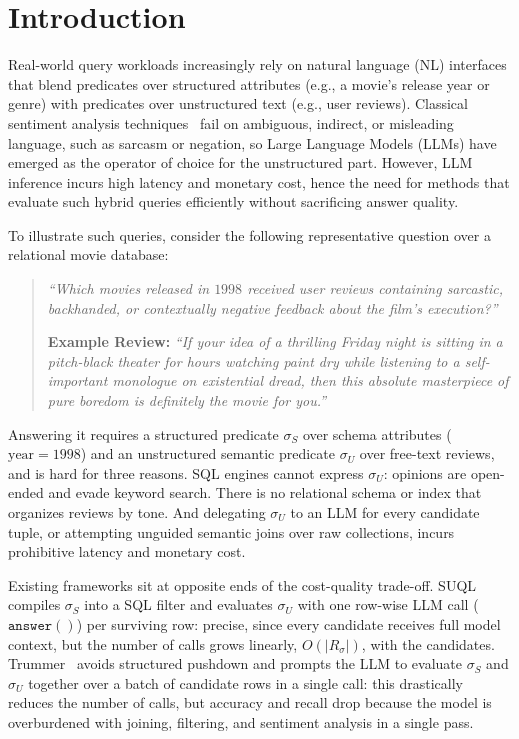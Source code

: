 \section{Introduction}
\label{sec:intro}
Real-world query workloads increasingly rely on natural language (NL) interfaces that blend predicates over structured attributes (e.g., a movie's release year or genre) with predicates over unstructured text (e.g., user reviews). Classical sentiment analysis techniques~\cite{Chandan2025ACS} fail on ambiguous, indirect, or misleading language, such as sarcasm or negation, so Large Language Models (LLMs) have emerged as the operator of choice for the unstructured part. However, LLM inference incurs high latency and monetary cost, hence the need for methods that evaluate such hybrid queries efficiently without sacrificing answer quality.

To illustrate such queries, consider the following representative question over a relational movie database:
\begin{quote}
\textit{``Which movies released in $1998$ received user reviews containing sarcastic, backhanded, or contextually negative feedback about the film's execution?''}

\smallskip
\noindent\textbf{Example Review:} \textit{``If your idea of a thrilling Friday night is sitting in a pitch-black theater for hours watching paint dry while listening to a self-important monologue on existential dread, then this absolute masterpiece of pure boredom is definitely the movie for you.''}
\end{quote}
Answering it requires a structured predicate $\sigma_S$ over schema attributes ($\text{year} = 1998$) and an unstructured semantic predicate $\sigma_U$ over free-text reviews, and is hard for three reasons. SQL engines cannot express $\sigma_U$: opinions are open-ended and evade keyword search. There is no relational schema or index that organizes reviews by tone. And delegating $\sigma_U$ to an LLM for every candidate tuple, or attempting unguided semantic joins over raw collections, incurs prohibitive latency and monetary cost.

Existing frameworks sit at opposite ends of the cost-quality trade-off. SUQL~\cite{liu2023suql} compiles $\sigma_S$ into a SQL filter and evaluates $\sigma_U$ with one row-wise LLM call ($\mathtt{answer()}$) per surviving row: precise, since every candidate receives full model context, but the number of calls grows linearly, $O(|R_\sigma|)$, with the candidates. Trummer~\cite{trummer2025semanticjoin} avoids structured pushdown and prompts the LLM to evaluate $\sigma_S$ and $\sigma_U$ together over a batch of candidate rows in a single call: this drastically reduces the number of calls, but accuracy and recall drop because the model is overburdened with joining, filtering, and sentiment analysis in a single pass.

